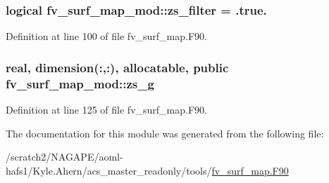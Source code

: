 \subsubsection[{zs\-\_\-filter}]{\setlength{\rightskip}{0pt plus 5cm}logical fv\-\_\-surf\-\_\-map\-\_\-mod\-::zs\-\_\-filter = .true.\hspace{0.3cm}{\ttfamily [private]}}\label{classfv__surf__map__mod_a536f543b0d6bb2e2fbb3d98468ef8094}


Definition at line 100 of file fv\-\_\-surf\-\_\-map.\-F90.

\subsubsection[{zs\-\_\-g}]{\setlength{\rightskip}{0pt plus 5cm}real, dimension(\-:,\-:), allocatable, public fv\-\_\-surf\-\_\-map\-\_\-mod\-::zs\-\_\-g}\label{classfv__surf__map__mod_a39c1cec935bdd6e01b87eb1ec5187941}


Definition at line 125 of file fv\-\_\-surf\-\_\-map.\-F90.



The documentation for this module was generated from the following file\-:\begin{DoxyCompactItemize}
\item 
/scratch2/\-N\-A\-G\-A\-P\-E/aoml-\/hafs1/\-Kyle.\-Ahern/acs\-\_\-master\-\_\-readonly/tools/\hyperlink{fv__surf__map_8F90}{fv\-\_\-surf\-\_\-map.\-F90}\end{DoxyCompactItemize}
